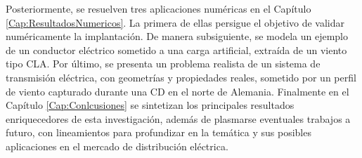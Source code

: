 Posteriormente, se resuelven tres aplicaciones numéricas en el Capítulo \ref{Cap:ResultadosNumericos}. La primera de ellas persigue el objetivo de validar numéricamente la implantación. De manera subsiguiente, se modela un ejemplo de un conductor eléctrico sometido a una carga artificial, extraída de un viento tipo \gls{CLA}. Por último, se presenta un problema realista de un sistema de transmisión eléctrica, con geometrías y propiedades reales, sometido por un perfil de viento capturado durante una CD en el norte de Alemania. Finalmente en el Capítulo \ref{Cap:Conlcusiones} se sintetizan los principales resultados enriquecedores de esta investigación, además de plasmarse eventuales trabajos a futuro, con lineamientos para profundizar en la temática y sus posibles aplicaciones en el mercado de distribución eléctrica.  
